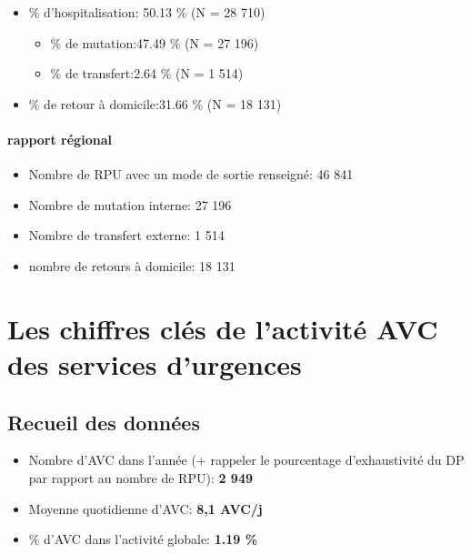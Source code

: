 \documentclass[]{article}
\begin{document}
\begin{itemize}
\itemsep1pt\parskip0pt
\item
  \% d'hospitalisation: 50.13 \% (N = 28 710)

  \begin{itemize}
  \itemsep1pt\parskip0pt
  \item
    \% de mutation:47.49 \% (N = 27 196)
  \item
    \% de transfert:2.64 \% (N = 1 514)
  \end{itemize}
\item
  \% de retour à domicile:31.66 \% (N = 18 131)
\end{itemize}

\paragraph{rapport régional}\label{rapport-regional}

\begin{itemize}
\itemsep1pt\parskip0pt
\item
  Nombre de RPU avec un mode de sortie renseigné: 46 841
\item
  Nombre de mutation interne: 27 196
\item
  Nombre de transfert externe: 1 514
\item
  nombre de retours à domicile: 18 131
\end{itemize}

\section{Les chiffres clés de l'activité AVC des services
d'urgences}\label{les-chiffres-cles-de-lactivite-avc-des-services-durgences}

\subsection{Recueil des données}\label{recueil-des-donnees-3}

\begin{itemize}
\itemsep1pt\parskip0pt
\item
  Nombre d'AVC dans l'année (+ rappeler le pourcentage d'exhaustivité du
  DP par rapport au nombre de RPU): \textbf{2 949}
\item
  Moyenne quotidienne d'AVC: \textbf{8,1 AVC/j}
\item
  \% d'AVC dans l'activité globale: \textbf{1.19 \%}
\end{itemize}
\end{document}
